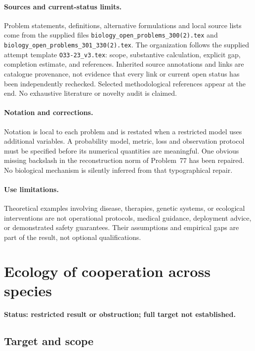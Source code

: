 \documentclass[11pt]{article}
\begin{document}
\paragraph{Sources and current-status limits.}
Problem statements, definitions, alternative formulations and local source lists
come from the supplied files
\texttt{biology\_open\_problems\_300(2).tex} and
\texttt{biology\_open\_problems\_301\_330(2).tex}.
The organization follows the supplied attempt template
\texttt{O33-23\_v3.tex}: scope, substantive calculation, explicit gap,
completion estimate, and references. Inherited source annotations and links are
catalogue provenance, not evidence that every link or current open status has
been independently rechecked. Selected methodological references appear at the
end. No exhaustive literature or novelty audit is claimed.

\paragraph{Notation and corrections.}
Notation is local to each problem and is restated when a restricted model uses
additional variables. A probability model, metric, loss and observation protocol
must be specified before its numerical quantities are meaningful. One obvious
missing backslash in the reconstruction norm of Problem~77 has been repaired.
No biological mechanism is silently inferred from that typographical repair.

\paragraph{Use limitations.}
Theoretical examples involving disease, therapies, genetic systems, or ecological
interventions are not operational protocols, medical guidance, deployment advice,
or demonstrated safety guarantees. Their assumptions and empirical gaps are part
of the result, not optional qualifications.


\section*{Ecology of cooperation across species}
\label{prob:199}
\noindent\textbf{Status: restricted result or obstruction; full target not established.}
\subsection{Target and scope}
\end{document}
